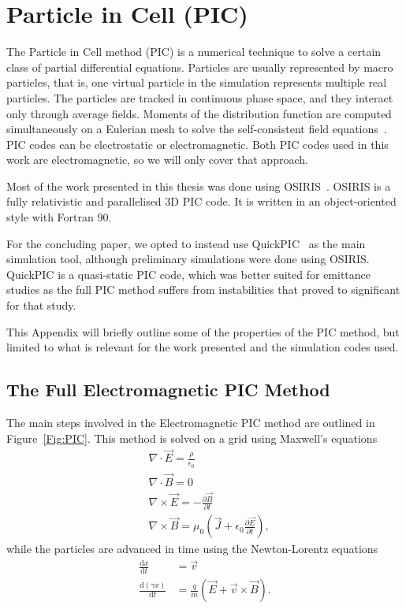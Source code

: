 %
%

\chapter{Particle in Cell (PIC)}
\label{Apx:PIC}

The Particle in Cell method (PIC) is a numerical technique to solve a certain class of partial differential equations.
Particles are usually represented by macro particles, that is, one virtual particle in the simulation represents multiple real particles.
The particles are tracked in continuous phase space, and they interact only through average fields.
Moments of the distribution function are computed simultaneously on a Eulerian mesh to solve the self-consistent field equations~\cite{hatzky:2010}.
PIC codes can be electrostatic or electromagnetic.
Both PIC codes used in this work are electromagnetic, so we will only cover that approach.

Most of the work presented in this thesis was done using OSIRIS~\cite{fonseca:2002, add:fonseca:2017}.
OSIRIS is a fully relativistic and parallelised 3D PIC code.
It is written in an object-oriented style with Fortran 90.

For the concluding paper, we opted to instead use QuickPIC~\cite{an:2013, huang:2006} as the main simulation tool, although preliminary simulations were done using OSIRIS.
QuickPIC is a quasi-static PIC code, which was better suited for emittance studies as the full PIC method suffers from instabilities that proved to significant for that study.

This Appendix will briefly outline some of the properties of the PIC method, but limited to what is relevant for the work presented and the simulation codes used.

\section{The Full Electromagnetic PIC Method}
\label{PIC:EM}

The main steps involved in the Electromagnetic PIC method are outlined in Figure~\ref{Fig:PIC}.
This method is solved on a grid using Maxwell's equations
\begin{align}
    &\nabla\cdot\vec{E}  = \frac{\rho}{\epsilon_0} \\
    &\nabla\cdot\vec{B}  = 0 \\
    &\nabla\times\vec{E} = -\frac{\partial\vec{B}}{\partial t} \\
    &\nabla\times\vec{B} = \mu_0\left(\vec{J} + \epsilon_0\frac{\partial\vec{E}}{\partial t}\right),
\end{align}
while the particles are advanced in time using the Newton-Lorentz equations
\begin{align}
    \frac{\mathrm{d}x}{\mathrm{d}t} &= \vec{v} \\
    \frac{\mathrm{d}(\gamma x)}{\mathrm{d}t} &= \frac{q}{m}\left(\vec{E}+\vec{v}\times\vec{B}\right).
\end{align}

